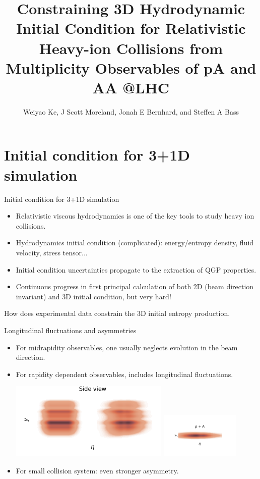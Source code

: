 \documentclass[11pt]{beamer}
\author[Weiyao Ke]{Weiyao Ke, J Scott Moreland, Jonah E Bernhard, and Steffen A Bass}
\title[3D Initial Condition]{Constraining 3D Hydrodynamic Initial Condition for Relativistic Heavy-ion Collisions from Multiplicity Observables of pA and AA @LHC }
\institute{Duke University}
\date{}
\begin{document}
\begin{frame}
\titlepage
\end{frame}

\section{Initial condition for 3+1D simulation}
\begin{frame}{Initial condition for 3+1D simulation}
\begin{itemize}
\item Relativistic viscous hydrodynamics is one of the key tools to study heavy ion collisions.
\item Hydrodynamics initial condition (complicated): energy/entropy density, fluid velocity, stress tensor...
\item Initial condition uncertainties propagate to the extraction of QGP properties.
\item Continuous progress in first principal calculation of both 2D (beam direction invariant) and 3D initial condition, but very hard!
\end{itemize}
\begin{center}
\color{red} How does experimental data constrain the 3D initial entropy production.
\end{center}
\end{frame}

\begin{frame}{Longitudinal fluctuations and asymmetries}
\begin{itemize}
\item For midrapidity observables, one usually neglects evolution in the beam direction.
\item For rapidity dependent observables, includes longitudinal fluctuations.
\begin{center}
\includegraphics[width=0.6\textwidth]{nuclei_demo.pdf}
\includegraphics[width=0.3\textwidth]{pPb.pdf} 
\end{center}
\item For small collision system: even stronger asymmetry.
\end{itemize}
\end{frame}
\end{document}
